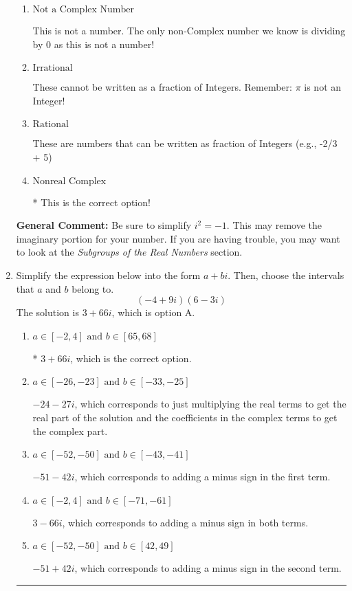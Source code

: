 \documentclass{extbook}[14pt]
\newcommand{\litem}[1]{\item #1

\rule{\textwidth}{0.4pt}}
\begin{document}
\begin{enumerate}
{\begin{enumerate}[label=\Alph*.]
This is a Complex number $(a+bi)$ that \textbf{only} has an imaginary part like $2i$.
\item \( \text{Not a Complex Number} \)

This is not a number. The only non-Complex number we know is dividing by 0 as this is not a number!
\item \( \text{Irrational} \)

These cannot be written as a fraction of Integers. Remember: $\pi$ is not an Integer!
\item \( \text{Rational} \)

These are numbers that can be written as fraction of Integers (e.g., -2/3 + 5)
\item \( \text{Nonreal Complex} \)

* This is the correct option!
\end{enumerate}

\textbf{General Comment:} Be sure to simplify $i^2 = -1$. This may remove the imaginary portion for your number. If you are having trouble, you may want to look at the \textit{Subgroups of the Real Numbers} section.
}
\litem{
Simplify the expression below into the form $a+bi$. Then, choose the intervals that $a$ and $b$ belong to.
\[ (-4 + 9 i)(6 - 3 i) \]The solution is \( 3 + 66 i \), which is option A.\begin{enumerate}[label=\Alph*.]
\item \( a \in [-2, 4] \text{ and } b \in [65, 68] \)

* $3 + 66 i$, which is the correct option.
\item \( a \in [-26, -23] \text{ and } b \in [-33, -25] \)

 $-24 - 27 i$, which corresponds to just multiplying the real terms to get the real part of the solution and the coefficients in the complex terms to get the complex part.
\item \( a \in [-52, -50] \text{ and } b \in [-43, -41] \)

 $-51 - 42 i$, which corresponds to adding a minus sign in the first term.
\item \( a \in [-2, 4] \text{ and } b \in [-71, -61] \)

 $3 - 66 i$, which corresponds to adding a minus sign in both terms.
\item \( a \in [-52, -50] \text{ and } b \in [42, 49] \)

 $-51 + 42 i$, which corresponds to adding a minus sign in the second term.
\end{enumerate}

}
\end{enumerate}
\end{document}
